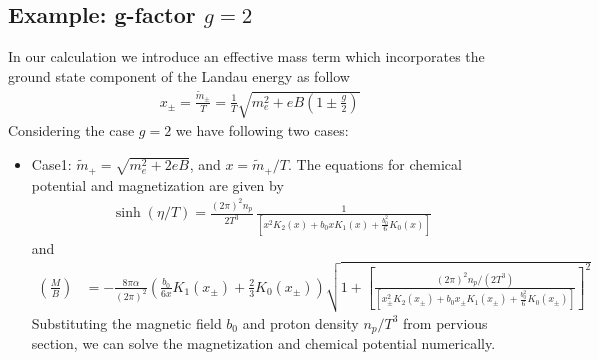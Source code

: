 \documentclass[Universe,article,submit,moreauthors,pdftex]{Definitions/mdpi}
\begin{document}
\subsection{Example: g-factor $g=2$}
In our calculation we introduce an effective mass term which incorporates the ground state component of the Landau energy as follow
\begin{align}
x_\pm=\frac{\tilde{m}_\pm}{T}=\frac{1}{T}\sqrt{m^2_e+eB\left(1\pm\frac{g}{2}\right)}
\end{align}
Considering the case $g=2$ we have following two cases:
\begin{itemize}
  \item Case1: $\tilde m_+=\sqrt{m^2_e+2eB}$, and $x=\tilde m_+/T$. The equations for chemical potential and magnetization are given by
  \begin{align}\label{chemical_001}
 \sinh{(\eta/T)}=\frac{(2\pi)^2n_p}{2T^3}\,\frac{1}{\left[x^2K_2(x)+b_0x K_1(x)+\frac{b^2_0}{6}K_0(x)\right]}
  \end{align}
  and
  \begin{align}\label{Magnetization_001}
 \left(\frac{M}{B}\right)&=-\frac{8\pi\alpha}{(2\pi)^2}\left(\frac{b_0}{6x}K_1(x_\pm)+\frac{2}{3}K_0(x_\pm)\right)\sqrt{1+\left[\frac{{(2\pi)^2n_p}/{(2T^3)}}{\left[x_\pm^2K_2(x_\pm)+b_0x_\pm K_1(x_\pm)+\frac{b^2_0}{6}K_0(x_\pm)\right]}\right]^2}
   \end{align}
Substituting the magnetic field $b_0$ and proton density $n_p/T^3$ from pervious section, we can solve the magnetization and chemical potential numerically. 


\end{itemize}
\end{document}
